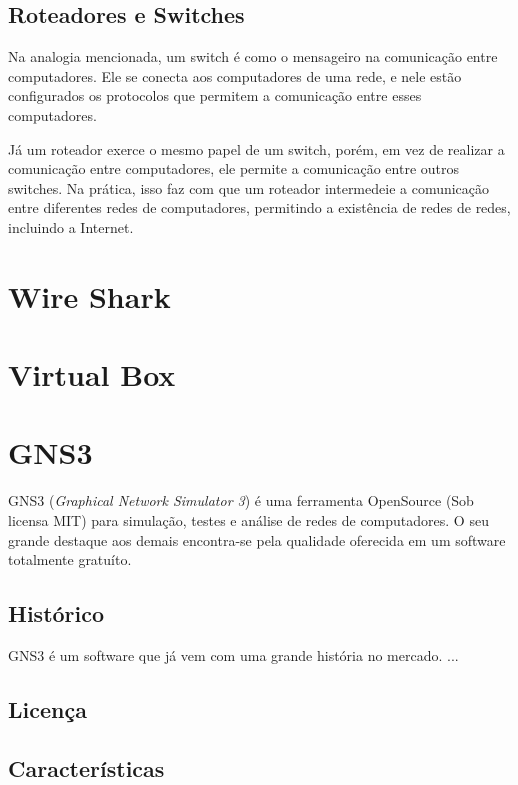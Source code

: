 \subsection{Roteadores e Switches}
\label{ch:roteadores e switches}

Na analogia mencionada, um switch \cite{radware} é como o mensageiro na comunicação entre computadores. Ele se conecta aos computadores de uma rede, e nele estão configurados os protocolos que permitem a comunicação entre esses computadores.

Já um roteador exerce o mesmo papel de um switch, porém, em vez de realizar a comunicação entre computadores, ele permite a comunicação entre outros switches. Na prática, isso faz com que um roteador intermedeie a comunicação entre diferentes redes de computadores, permitindo a existência de redes de redes, incluindo a Internet.

\section{Wire Shark}

\section{Virtual Box}

\section{GNS3}
GNS3 (\textit{Graphical Network Simulator 3}) é uma ferramenta OpenSource (Sob licensa MIT) para simulação, testes e análise de redes de computadores. O seu grande destaque aos demais encontra-se pela qualidade oferecida em um software totalmente gratuíto.
\subsection{Histórico}
GNS3 é um software que já vem com uma grande história no mercado.
...

\subsection{Licença}

\subsection{Características}
